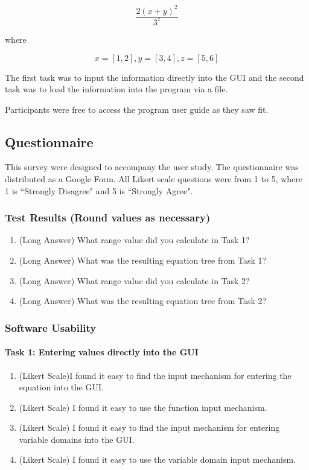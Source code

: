 \documentclass[12pt, titlepage]{article}
\begin{document}
$$\frac{2(x + y)^2}{3^z}$$

where

$$x = [1, 2], y = [3, 4], z = [5, 6]$$

The first task was to input the information directly into the GUI and the 
second task was to load the information into the program via a file.

Participants were free to access the program user guide as they saw fit. 

\subsection{Questionnaire}
This survey were designed to accompany the user study. The questionnaire was 
distributed as a Google Form. All Likert scale questions were from 1 to 5, 
where 1 is ``Strongly Disagree" and 5 is ``Strongly Agree".

\subsubsection{Test Results (Round values as necessary)}
\begin{enumerate}
	\item (Long Answer) What range value did you calculate in Task 1?
	\item (Long Answer) What was the resulting equation tree from Task 1?
	\item (Long Answer) What range value did you calculate in Task 2?
	\item (Long Answer) What was the resulting equation tree from Task 2?
\end{enumerate}

\subsubsection{Software Usability}
\paragraph{Task 1: Entering values directly into the GUI}
\begin{enumerate}
	\item (Likert Scale)I found it easy to find the input mechanism for 
	entering 
	the equation into the GUI.
	
	\item (Likert Scale) I found it easy to use the function input mechanism.
	
	\item (Likert Scale) I found it easy to find the input mechanism for 
	entering variable domains into the GUI. 
	
	\item (Likert Scale) I found it easy to use the variable domain input 
	mechanism. 
\end{enumerate}
\end{document}
